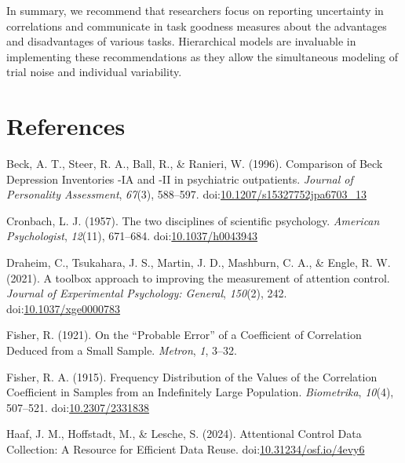 \documentclass[
  ,man]{apa6}
\newlength{\cslhangindent}
\newenvironment{CSLReferences}[2] %
 {\begin{list}{}{%
  \setlength{\itemindent}{0pt}
  \setlength{\leftmargin}{0pt}
  \setlength{\parsep}{0pt}
  \ifodd #1
   \setlength{\leftmargin}{\cslhangindent}
   \setlength{\itemindent}{-1\cslhangindent}
  \fi
  \setlength{\itemsep}{#2\baselineskip}}}
 {\end{list}}
\begin{document}
In summary, we recommend that researchers focus on reporting uncertainty in correlations and communicate in task goodness measures about the advantages and disadvantages of various tasks. Hierarchical models are invaluable in implementing these recommendations as they allow the simultaneous modeling of trial noise and individual variability.

\newpage

\section*{References}\label{references}

\label{refs}
\begin{CSLReferences}{1}{0}
Beck, A. T., Steer, R. A., Ball, R., \& Ranieri, W. (1996). Comparison of {Beck Depression Inventories} -{IA} and -{II} in psychiatric outpatients. \emph{Journal of Personality Assessment}, \emph{67}(3), 588--597. doi:\href{https://doi.org/10.1207/s15327752jpa6703_13}{10.1207/s15327752jpa6703\_13}

Cronbach, L. J. (1957). The two disciplines of scientific psychology. \emph{American Psychologist}, \emph{12}(11), 671--684. doi:\href{https://doi.org/10.1037/h0043943}{10.1037/h0043943}

Draheim, C., Tsukahara, J. S., Martin, J. D., Mashburn, C. A., \& Engle, R. W. (2021). A toolbox approach to improving the measurement of attention control. \emph{Journal of Experimental Psychology: General}, \emph{150}(2), 242. doi:\href{https://doi.org/10.1037/xge0000783}{10.1037/xge0000783}

Fisher, R. (1921). On the {``{Probable Error}''} of a {Coefficient} of {Correlation Deduced} from a {Small Sample}. \emph{Metron}, \emph{1}, 3--32.

Fisher, R. A. (1915). Frequency {Distribution} of the {Values} of the {Correlation Coefficient} in {Samples} from an {Indefinitely Large Population}. \emph{Biometrika}, \emph{10}(4), 507--521. doi:\href{https://doi.org/10.2307/2331838}{10.2307/2331838}

Haaf, J. M., Hoffstadt, M., \& Lesche, S. (2024). Attentional {Control Data Collection}: {A Resource} for {Efficient Data Reuse}. doi:\href{https://doi.org/10.31234/osf.io/4evy6}{10.31234/osf.io/4evy6}


\end{CSLReferences}
\end{document}
